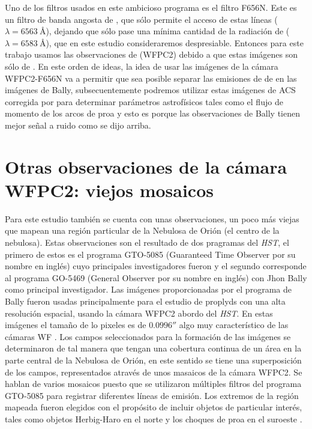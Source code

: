 Uno de los filtros usados en este ambicioso programa es el filtro F656N. Este es un filtro de banda angosta de \ha{}, que sólo permite el acceso de estas líneas (\ha{}~\(\lambda = 6563~\text{\AA{}}\)), dejando que sólo pase una mínima cantidad de la radiación de \nii{} (\(\lambda = 6583~\text{\AA{}}\)), que en este estudio consideraremos despresiable. Entonces para este trabajo usamos las observaciones de \citet{Robberto:2013a} (WFPC2) debido a que estas imágenes son sólo de \ha{}. En este orden de ideas, la idea de usar las imágenes de la cámara WFPC2-F656N va a permitir que sea posible separar las emisiones de \ha{} de \nii{} en las imágenes de Bally, subsecuentemente  podremos  utilizar estas imágenes de ACS corregida por \nii{} para determinar parámetros astrofísicos tales como el flujo de momento de los arcos de proa y esto es  porque las observaciones de Bally tienen mejor señal a ruido como se dijo arriba.

\section{Otras observaciones de la cámara WFPC2:  viejos mosaicos}
\label{sec:mosaic}

Para este estudio también se cuenta con unas observaciones, un poco más viejas que mapean una región particular de la Nebulosa de Orión (el centro de la nebulosa). Estas observaciones son el resultado de dos pragramas del \textit{HST}, el primero de estos es el programa GTO-5085 (Guaranteed Time Observer  por su nombre en inglés) cuyo principales investigadores fueron  \citet{Odell:1996} y el segundo corresponde al programa GO-5469 (General Observer por su nombre en inglés) con Jhon Bally como principal investigador. Las imágenes proporcionadas por el programa de Bally fueron usadas principalmente para el estudio de proplyds con una  alta resolución espacial, usando la cámara WFPC2 abordo del \textit{HST}. En estas imágenes el tamaño de lo pixeles es de \(0.0996''\) algo muy característico de las cámaras WF \citep{Holtzman:1995}. Los campos seleccionados para la formación de las imágenes se determinaron de tal manera que tengan una cobertura continua de un área en la parte central de la Nebulosa de Orión, en este sentido se tiene una superposición de los campos, representados através de unos  masaicos de la cámara WFPC2. Se hablan de varios mosaicos puesto que se utilizaron múltiples filtros del programa GTO-5085 para registrar diferentes líneas de emisión. Los extremos de la región mapeada fueron elegidos con el propósito de incluir objetos de particular interés, tales como objetos Herbig-Haro en el norte y los choques de proa en el suroeste \citep{Odell:1996}.\\


